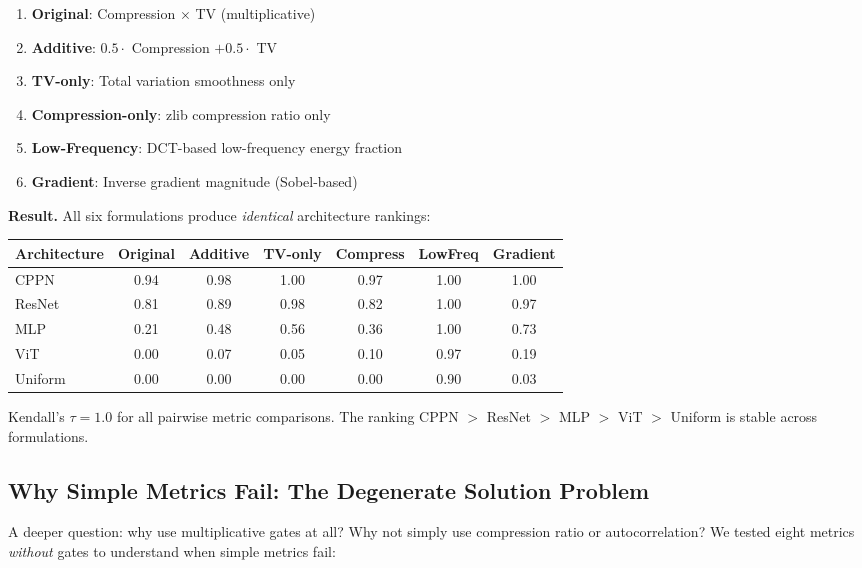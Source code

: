 \begin{enumerate}
    \item \textbf{Original}: Compression $\times$ TV (multiplicative)
    \item \textbf{Additive}: $0.5 \cdot$ Compression $+ 0.5 \cdot$ TV
    \item \textbf{TV-only}: Total variation smoothness only
    \item \textbf{Compression-only}: zlib compression ratio only
    \item \textbf{Low-Frequency}: DCT-based low-frequency energy fraction
    \item \textbf{Gradient}: Inverse gradient magnitude (Sobel-based)
\end{enumerate}

\textbf{Result.} All six formulations produce \emph{identical} architecture rankings:

\begin{center}
\begin{tabular}{lcccccc}
\toprule
Architecture & Original & Additive & TV-only & Compress & LowFreq & Gradient \\
\midrule
CPPN & 0.94 & 0.98 & 1.00 & 0.97 & 1.00 & 1.00 \\
ResNet & 0.81 & 0.89 & 0.98 & 0.82 & 1.00 & 0.97 \\
MLP & 0.21 & 0.48 & 0.56 & 0.36 & 1.00 & 0.73 \\
ViT & 0.00 & 0.07 & 0.05 & 0.10 & 0.97 & 0.19 \\
Uniform & 0.00 & 0.00 & 0.00 & 0.00 & 0.90 & 0.03 \\
\bottomrule
\end{tabular}
\end{center}

Kendall's $\tau = 1.0$ for all pairwise metric comparisons. The ranking CPPN $>$ ResNet $>$ MLP $>$ ViT $>$ Uniform is stable across formulations.

\subsection{Why Simple Metrics Fail: The Degenerate Solution Problem}

A deeper question: why use multiplicative gates at all? Why not simply use compression ratio or autocorrelation? We tested eight metrics \emph{without} gates to understand when simple metrics fail:


